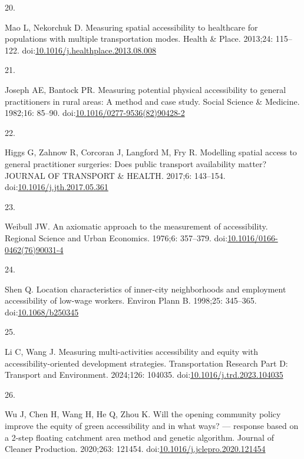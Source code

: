 \documentclass[10pt,letterpaper]{article}
\newlength{\cslhangindent}
\newlength{\csllabelwidth}
\newlength{\cslentryspacingunit} %
\newenvironment{CSLReferences}[2] %
 {%
  \setlength{\parindent}{0pt}
  \ifodd #1
  \let\oldpar\par
  \def\par{\hangindent=\cslhangindent\oldpar}
  \fi
  \setlength{\parskip}{#2\cslentryspacingunit}
 }%
 {}
\newcommand{\CSLLeftMargin}[1]{\parbox[t]{\csllabelwidth}{#1}}
\newcommand{\CSLRightInline}[1]{\parbox[t]{\linewidth - \csllabelwidth}{#1}\break}
\begin{document}
\begin{CSLReferences}{0}{0}
\leavevmode{}%
\CSLLeftMargin{20. }%
\CSLRightInline{Mao L, Nekorchuk D. Measuring spatial accessibility to
healthcare for populations with multiple transportation modes. Health \&
Place. 2013;24: 115--122.
doi:\href{https://doi.org/10.1016/j.healthplace.2013.08.008}{10.1016/j.healthplace.2013.08.008}}

\leavevmode{}%
\CSLLeftMargin{21. }%
\CSLRightInline{Joseph AE, Bantock PR. Measuring potential physical
accessibility to general practitioners in rural areas: A method and case
study. Social Science \& Medicine. 1982;16: 85--90.
doi:\href{https://doi.org/10.1016/0277-9536(82)90428-2}{10.1016/0277-9536(82)90428-2}}

\leavevmode{}%
\CSLLeftMargin{22. }%
\CSLRightInline{Higgs G, Zahnow R, Corcoran J, Langford M, Fry R.
Modelling spatial access to general practitioner surgeries: Does public
transport availability matter? {JOURNAL} {OF} {TRANSPORT} \& {HEALTH}.
2017;6: 143--154.
doi:\href{https://doi.org/10.1016/j.jth.2017.05.361}{10.1016/j.jth.2017.05.361}}

\leavevmode{}%
\CSLLeftMargin{23. }%
\CSLRightInline{Weibull JW. An axiomatic approach to the measurement of
accessibility. Regional Science and Urban Economics. 1976;6: 357--379.
doi:\href{https://doi.org/10.1016/0166-0462(76)90031-4}{10.1016/0166-0462(76)90031-4}}

\leavevmode{}%
\CSLLeftMargin{24. }%
\CSLRightInline{Shen Q. Location characteristics of inner-city
neighborhoods and employment accessibility of low-wage workers. Environ
Plann B. 1998;25: 345--365.
doi:\href{https://doi.org/10.1068/b250345}{10.1068/b250345}}

\leavevmode{}%
\CSLLeftMargin{25. }%
\CSLRightInline{Li C, Wang J. Measuring multi-activities accessibility
and equity with accessibility-oriented development strategies.
Transportation Research Part D: Transport and Environment. 2024;126:
104035.
doi:\href{https://doi.org/10.1016/j.trd.2023.104035}{10.1016/j.trd.2023.104035}}

\leavevmode{}%
\CSLLeftMargin{26. }%
\CSLRightInline{Wu J, Chen H, Wang H, He Q, Zhou K. Will the opening
community policy improve the equity of green accessibility and in what
ways? --- response based on a 2-step floating catchment area method and
genetic algorithm. Journal of Cleaner Production. 2020;263: 121454.
doi:\href{https://doi.org/10.1016/j.jclepro.2020.121454}{10.1016/j.jclepro.2020.121454}}


\end{CSLReferences}
\end{document}
